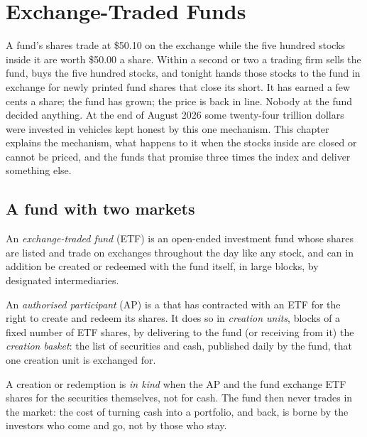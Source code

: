 \chapter{Exchange-Traded Funds}\label{ch:m1:exchange-traded-funds}

A fund's shares trade at \$50.10 on the exchange while the five hundred
stocks inside it are worth \$50.00 a share. Within a second or two a trading
firm sells the fund, buys the five hundred stocks, and tonight hands those
stocks to the fund in exchange for newly printed fund shares that close its
short. It has earned a few cents a share; the fund has grown; the price is
back in line. Nobody at the fund decided anything. At the end of August 2026
some twenty-four trillion dollars were invested in vehicles kept honest by
this one mechanism. This chapter explains the mechanism, what happens to it
when the stocks inside are closed or cannot be priced, and the funds that
promise three times the index and deliver something else.

\section{A fund with two markets}

\begin{definition}\label{def:m1:exchange-traded-funds:etf}
An \emph{exchange-traded fund} (ETF) is an
open-ended investment fund whose shares are listed and trade on exchanges
throughout the day like any stock, and can in addition be created or redeemed
with the fund itself, in large blocks, by designated intermediaries.
\end{definition}

\begin{definition}\label{def:m1:exchange-traded-funds:ap}
An \emph{authorised participant} (AP) is a
 that has contracted with an ETF for the right to create and
redeem its shares. It does so in \emph{creation units},
blocks of a fixed number of ETF shares, by delivering to the fund (or
receiving from it) the \emph{creation basket}: the
list of securities and cash, published daily by the fund, that one creation
unit is exchanged for.
\end{definition}

\begin{definition}\label{def:m1:exchange-traded-funds:inkind}
A creation or redemption is \emph{in kind} when the
AP and the fund exchange ETF shares for the securities themselves, not for
cash. The fund then never trades in the market: the cost of turning cash
into a portfolio, and back, is borne by the investors who come and go, not by
those who stay.
\end{definition}

